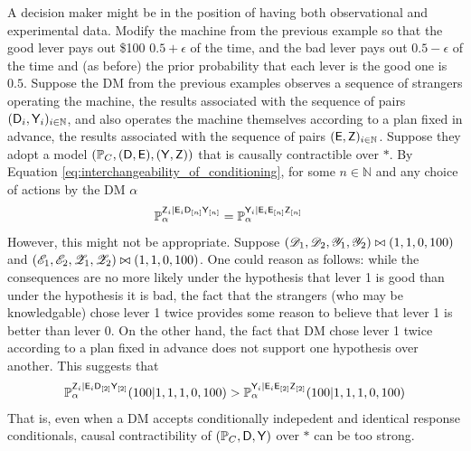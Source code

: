 A decision maker might be in the position of having both observational and experimental data. Modify the machine from the previous example so that the good lever pays out \$100 $0.5+\epsilon$ of the time, and the bad lever pays out $0.5-\epsilon$ of the time and (as before) the prior probability that each lever is the good one is $0.5$. Suppose the DM from the previous examples observes a sequence of strangers operating the machine, the results associated with the sequence of pairs $(\mathsf{D}_i,\mathsf{Y}_i)_{i\in\mathbb{N}}$, and also operates the machine themselves according to a plan fixed in advance, the results associated with the sequence of pairs $(\mathsf{E},\mathsf{Z})_{i\in \mathbb{N}}$. Suppose they adopt a model $(\mathbb{P}_C,(\mathsf{D},\mathsf{E}),(\mathsf{Y},\mathsf{Z}))$ that is causally contractible over $*$. By Equation \ref{eq:interchangeability_of_conditioning}, for some $n\in\mathbb{N}$ and any choice of actions by the DM $\alpha$
\begin{align}
    \mathbb{P}_\alpha^{\mathsf{Z}_i|\mathsf{E}_i\mathsf{D}_{[n]}\mathsf{Y}_{[n]}} &= \mathbb{P}_\alpha^{\mathsf{Y}_i|\mathsf{E}_i\mathsf{E}_{[n]}\mathsf{Z}_{[n]}}
\end{align}
However, this might not be appropriate. Suppose $(\mathscr{D}_1,\mathscr{D}_2,\mathscr{Y}_1,\mathscr{Y}_2)\bowtie (1,1,0,100)$ and $(\mathscr{E}_1,\mathscr{E}_2,\mathscr{Z}_1,\mathscr{Z}_2)\bowtie (1,1,0,100)$. One could reason as follows: while the consequences are no more likely under the hypothesis that lever 1 is good than under the hypothesis it is bad, the fact that the strangers (who may be knowledgable) chose lever 1 twice provides some reason to believe that lever 1 is better than lever 0. On the other hand, the fact that DM chose lever 1 twice according to a plan fixed in advance does not support one hypothesis over another. This suggests that
\begin{align}
    \mathbb{P}_\alpha^{\mathsf{Z}_i|\mathsf{E}_i\mathsf{D}_{[2]}\mathsf{Y}_{[2]}}(100|1,1,1,0,100) > \mathbb{P}_\alpha^{\mathsf{Y}_i|\mathsf{E}_i\mathsf{E}_{[2]}\mathsf{Z}_{[2]}}(100|1,1,1,0,100)
\end{align}
That is, even when a DM accepts conditionally indepedent and identical response conditionals, causal contractibility of $(\mathbb{P}_C,\mathsf{D},\mathsf{Y})$ over $*$ can be too strong.

